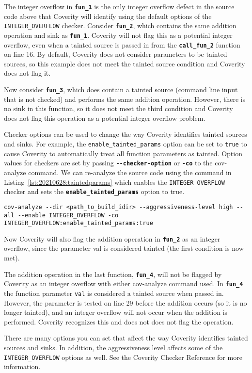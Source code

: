 The integer overflow in \textbf{\texttt{fun\_1}} is the only integer overflow defect in the source code above that Coverity will identify using the default options of the \texttt{INTEGER\_OVERFLOW} checker. Consider \textbf{\texttt{fun\_2}}, which contains the same addition operation and sink as \textbf{\texttt{fun\_1}}. Coverity will not flag this as a potential integer overflow, even when a tainted source is passed in from the \textbf{\texttt{call\_fun\_2}} function on line 16. By default, Coverity does not consider parameters to be tainted sources, so this example does not meet the tainted source condition and Coverity does not flag it.

Now consider \textbf{\texttt{fun\_3}}, which does contain a tainted source (command line input that is not checked) and performs the same addition operation. However, there is no sink in this function, so it does not meet the third condition and Coverity does not flag this operation as a potential integer overflow problem.

Checker options can be used to change the way Coverity identifies tainted sources and sinks. For example, the \texttt{enable\_tainted\_params} option can be set to \texttt{true} to cause Coverity to automatically treat all function parameters as tainted. Option values for checkers are set by passing \textbf{\texttt{-\phantom{}-checker-option}} or \textbf{\texttt{-co}} to the cov-analyze command. We can re-analyze the source code using the command in Listing~\ref{lst:20210628:taintedparams} which enables the \texttt{INTEGER\_OVERFLOW} checker and sets the \textbf{\texttt{enable\_tainted\_params}} option to true.
\begin{lstlisting}[caption={Cov-analyze Parameters for Tainted Parameters},captionpos=b,style=BashStyle,basicstyle=\small,label={lst:20210628:taintedparams},literate=*{-}{-}1,breaklines=true]
cov-analyze --dir <path_to_build_idir> --aggressiveness-level high --all --enable INTEGER_OVERFLOW -co INTEGER_OVERFLOW:enable_tainted_params:true
\end{lstlisting}

Now Coverity will also flag the addition operation in \textbf{\texttt{fun\_2}} as an integer overflow, since the parameter val is considered tainted (the first condition is now met).

The addition operation in the last function, \textbf{\texttt{fun\_4}}, will not be flagged by Coverity as an integer overflow with either cov-analyze command used. In \textbf{\texttt{fun\_4}} the function parameter \texttt{val} is considered a tainted source when passed in. However, the parameter is tested on line 29 before the addition occurs (so it is no longer tainted), and an integer overflow will not occur when the addition is performed. Coverity recognizes this and does not does not flag the operation.

There are many options you can set that affect the way Coverity identifies tainted sources and sinks. In addition, the aggressiveness level affects some of the \texttt{INTEGER\_OVERFLOW} options as well. See the Coverity Checker Reference\autocite{20210628:coverity} for more information.

